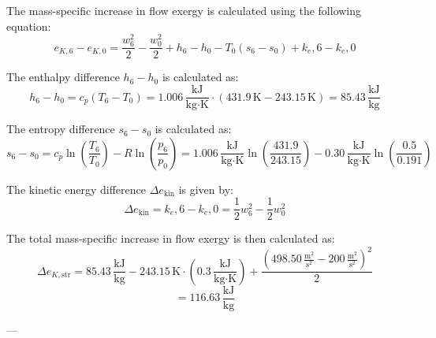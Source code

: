 The mass-specific increase in flow exergy is calculated using the following equation:  
\[
e_{K,6} - e_{K,0} = \frac{w_6^2}{2} - \frac{w_0^2}{2} + h_6 - h_0 - T_0(s_6 - s_0) + k_e,6 - k_e,0
\]  

The enthalpy difference \( h_6 - h_0 \) is calculated as:  
\[
h_6 - h_0 = c_p(T_6 - T_0) = 1.006 \, \frac{\text{kJ}}{\text{kg·K}} \cdot (431.9 \, \text{K} - 243.15 \, \text{K}) = 85.43 \, \frac{\text{kJ}}{\text{kg}}
\]  

The entropy difference \( s_6 - s_0 \) is calculated as:  
\[
s_6 - s_0 = c_p \ln\left(\frac{T_6}{T_0}\right) - R \ln\left(\frac{p_6}{p_0}\right) = 1.006 \, \frac{\text{kJ}}{\text{kg·K}} \ln\left(\frac{431.9}{243.15}\right) - 0.30 \, \frac{\text{kJ}}{\text{kg·K}} \ln\left(\frac{0.5}{0.191}\right)
\]  

The kinetic energy difference \( \Delta e_{\text{kin}} \) is given by:  
\[
\Delta e_{\text{kin}} = k_e,6 - k_e,0 = \frac{1}{2} w_6^2 - \frac{1}{2} w_0^2
\]  

The total mass-specific increase in flow exergy is then calculated as:  
\[
\Delta e_{K,\text{str}} = 85.43 \, \frac{\text{kJ}}{\text{kg}} - 243.15 \, \text{K} \cdot (0.3 \, \frac{\text{kJ}}{\text{kg·K}}) + \frac{(498.50 \, \frac{\text{m}^2}{\text{s}^2} - 200 \, \frac{\text{m}^2}{\text{s}^2})^2}{2}
\]  
\[
= 116.63 \, \frac{\text{kJ}}{\text{kg}}
\]  

---